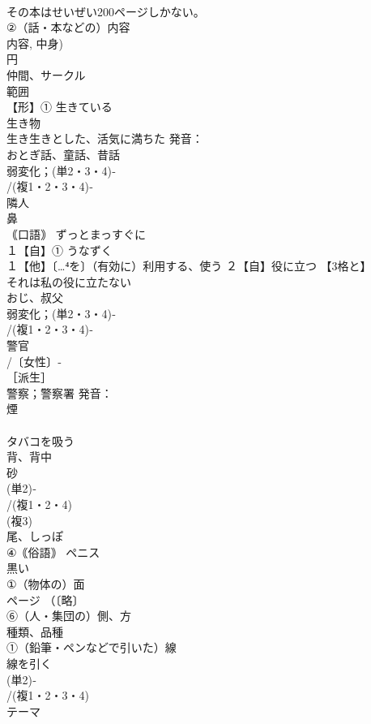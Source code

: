 \documentclass[8pt]{extreport}
\begin{document}
\begin{CJK}{UTF8}{min}
\\	その本はせいぜい200ページしかない。
\\	②（話・本などの）内容 
\\	内容, 中身)
\\	円 
\\	仲間、サークル　
\\	範囲
\\	【形】① 生きている 
\\	生き物 
\\	生き生きとした、活気に満ちた 発音：
\\	おとぎ話、童話、昔話 
\\	弱変化；(単2・3・4)‐
\\	/(複1・2・3・4)‐
\\	隣人 
\\	鼻 
\\	｟口語｠ ずっとまっすぐに
\\	１【自】① うなずく 
\\	１【他】〔…⁴を〕（有効に）利用する、使う ２【自】役に立つ 【3格と】
\\	それは私の役に立たない
\\	おじ、叔父 
\\	弱変化；(単2・3・4)‐
\\	/(複1・2・3・4)‐
\\	警官 
\\	/〔女性〕‐
\\	［派生］ 
\\	警察；警察署 発音：
\\	煙 
\\	[派生] 
\\	タバコを吸う 
\\	背、背中 
\\	砂 
\\	(単2)‐
\\	/(複1・2・4)
\\	(複3)
\\	尾、しっぽ 
\\	④｟俗語｠ ペニス 
\\	黒い
\\	①（物体の）面 
\\	ページ （〔略〕
\\	⑥（人・集団の）側、方
\\	種類、品種 
\\	①（鉛筆・ペンなどで引いた）線 
\\	線を引く
\\	(単2)‐
\\	/(複1・2・3・4)
\\	テーマ 

\end{CJK}
\end{document}
